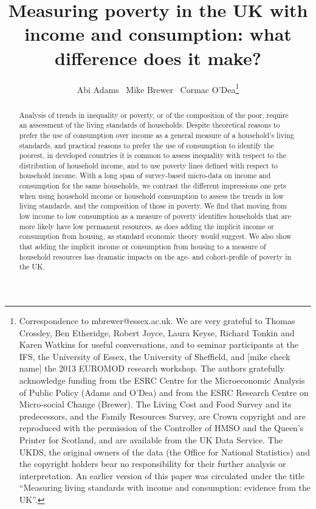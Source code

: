 \documentclass[11pt]{article} %
\title{Measuring poverty in the UK with income and consumption: what difference does it make?}
\author{Abi Adams \ Mike Brewer \ Cormac O'Dea\thanks{
Correspondence to mbrewer@essex.ac.uk. We are very grateful to Thomas Crossley, Ben Etheridge, Robert Joyce, Laura Keyse, Richard Tonkin and Karen Watkins for useful conversations, and to seminar participants at the IFS, the University of Essex, the University of Sheffield, and [mike check name] the 2013 EUROMOD research workshop. The authors gratefully acknowledge funding from the ESRC Centre for the Microeconomic Analysis of Public Policy (Adams and O'Dea) and from the ESRC Research Centre on Micro-social Change (Brewer). The Living Cost and Food Survey and its predecessors, and the Family Resources Survey, are Crown copyright and are reproduced with the permission of the Controller of HMSO and the Queen's Printer for Scotland, and are available from the UK Data Service. The UKDS, the original owners of the data (the Office for National Statistics) and the copyright holders bear no responsibility for their further analysis or interpretation. An earlier version of this paper was circulated under the title ``Measuring living standards with income and consumption: evidence from the UK''.}
}
\begin{document}
\maketitle

\begin{abstract}
%
Analysis of trends in inequality or poverty, or of the composition of the poor, require an assessment of the living standards of households. Despite theoretical reasons to prefer the use of consumption over income as a general measure of a household's living standards, and practical reasons to prefer the use of consumption to identify the poorest, in developed countries it is common to assess inequality with respect to the distribution of household income, and to use poverty lines defined with respect to household income. With a long span of survey-based micro-data on income and consumption for the same households, we contrast the different impressions one gets when using household income or household consumption to assess the trends in low living standards, and the composition of those in poverty. We find that moving from low income to low consumption as a measure of poverty identifies households that are more likely have low permanent resources, as does adding the implicit income or consumption from housing, as standard economic theory would suggest. We also show that adding the implicit income or consumption from housing to a measure of household resources has dramatic impacts on the age- and cohort-profile of poverty in the UK.
\end{abstract}









\newpage
%


\newpage
\appendix

%
\end{document}

